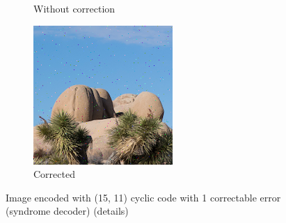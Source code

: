 \documentclass{article}
\begin{document}
\begin{figure}[htb]
\begin{subfigure}[b]{0.32\textwidth}
        \caption{Without correction}
        \label{fig:cropped-image-cyclic-15-11-no-correction}
    \end{subfigure}
    \hfill
    \begin{subfigure}[b]{0.32\textwidth}
        \centering
        \includegraphics[width=\textwidth]{../Result/Cyclic/15-11/cropped-cyclic-bsc-output-syndrome-corrected.png}
        \caption{Corrected}
        \label{fig:cropped-image-cyclic-15-11-syndrome-corrected}
    \end{subfigure}
       \caption{Image encoded with (15, 11) cyclic code with 1 correctable error (syndrome decoder) (details)}
       \label{fig:cropped-image-cyclic-15-11-syndrome}
\end{figure}
\end{document}

